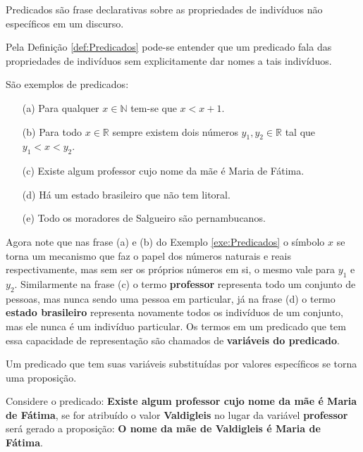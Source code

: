 \begin{definition}[Predicados]\label{def:Predicados}
	Predicados são frase declarativas sobre as propriedades de indivíduos não específicos em um discurso.
\end{definition}

Pela Definição \ref{def:Predicados} pode-se entender que um predicado fala das propriedades de indivíduos sem explicitamente dar nomes a tais indivíduos.

\begin{example}\label{exe:Predicados}
	São exemplos de predicados:
	\begin{itemize}
		\item[(a)] Para qualquer $x \in \mathbb{N}$ tem-se que $x < x + 1$.
		\item[(b)] Para todo $x \in \mathbb{R}$ sempre existem dois números $y_1, y_2 \in \mathbb{R}$ tal que $y_1 < x < y_2$.
		\item[(c)] Existe algum professor cujo nome da mãe é Maria de Fátima.
		\item[(d)] Há um estado brasileiro que não tem litoral.
		\item[(e)] Todo os moradores de Salgueiro são pernambucanos.
	\end{itemize}
\end{example}

Agora note que nas frase (a) e (b) do Exemplo \ref{exe:Predicados} o símbolo $x$ se torna um mecanismo que faz o papel dos números naturais e reais respectivamente, mas sem ser os próprios números em si, o mesmo vale para $y_1$ e $y_2$. Similarmente na frase (c) o termo \textbf{professor} representa todo um conjunto de pessoas, mas nunca sendo uma pessoa em particular, já na frase (d) o termo \textbf{estado brasileiro} representa novamente todos os indivíduos de um conjunto, mas ele nunca é um indivíduo particular. Os termos em um predicado que tem essa capacidade de representação são chamados de \textbf{variáveis do predicado}.

\begin{remark}
    Um predicado que tem suas variáveis substituídas por valores específicos se torna uma proposição. 
\end{remark}

\begin{example}\label{exe:AtribuirVariavelPredicado}
	Considere o predicado: \textbf{Existe algum professor cujo nome da mãe é Maria de Fátima}, se for atribuído o valor  \textbf{Valdigleis} no lugar da variável \textbf{professor} será gerado a proposição: \textbf{O nome da mãe de Valdigleis é Maria de Fátima}.
\end{example}

